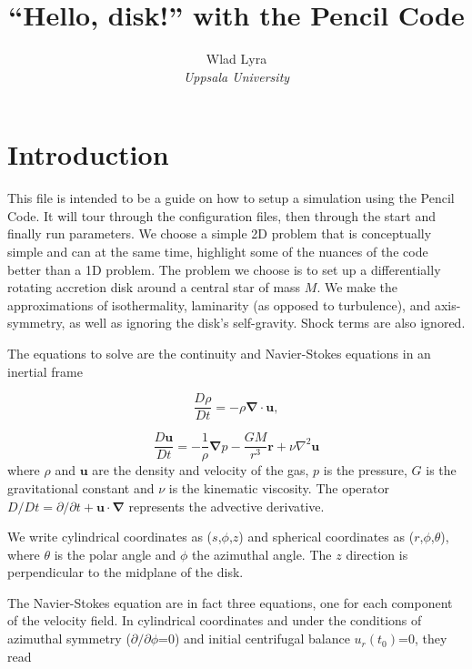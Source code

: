 \documentclass[a4paper,10pt]{article}
\newcommand{\pencilcode}{{\sc Pencil Code}}
\newcommand{\aderiv}[1]{\frac{D #1}{Dt}}
\renewcommand{\v}[1]{{\boldsymbol #1}} %
\newcommand{\del}{\v{\nabla}}
\newcommand{\grad}{\del}
\newcommand{\Div}{\v{\nabla}\cdot}
\newcommand{\Laplace}{\nabla^2}
\begin{document}
\date{}


\title{{\bf ``Hello, disk!'' with the \pencilcode}}


\author{Wlad Lyra\\
{\it Uppsala University}}               
\date{}  

\maketitle


\section{Introduction}

This file is intended to be a guide on how to setup a simulation using the \pencilcode. It will tour through the configuration files, then through the start and finally run parameters. We choose a simple 2D problem that is conceptually simple and can at the same time, highlight some of the nuances of the code better than a 1D problem. The problem we choose is to set up a differentially rotating accretion disk around a central star of mass $M$. We make the approximations of isothermality, laminarity (as opposed to turbulence), and axis-symmetry, as well as ignoring the disk's self-gravity. Shock terms are also ignored. 

The equations to solve are the continuity and Navier-Stokes equations in an inertial frame

\begin{equation}
\label{continuity}
  \aderiv{\rho} = -\rho{\Div\v{u}}, 
\end{equation}

\begin{equation}
\label{navierstokes}
  \aderiv{\v{u}} = -\frac{1}{\rho}\grad{p} - \frac{GM}{r^3}\v{r} + \nu\Laplace{\v{u}}
\end{equation}where $\rho$ and $\v{u}$ are the density and velocity of the gas, $p$ is the pressure, $G$ is the gravitational constant and $\nu$ is the kinematic viscosity. The operator ${D}/Dt = \partial /{\partial}t + \v{u}\cdot\del$ represents the advective derivative.

We write cylindrical coordinates as ($s$,$\phi$,$z$) and spherical coordinates as ($r$,$\phi$,$\theta$), where $\theta$ is the polar angle and $\phi$ the azimuthal angle. The $z$ direction is perpendicular to the midplane of the disk.

The Navier-Stokes equation are in fact three equations, one for each component of the velocity field. In cylindrical coordinates and under the conditions of azimuthal symmetry ($\partial /{\partial}\phi$=0) and initial centrifugal balance $u_{r}(t_0)$=0, they read
\end{document}
